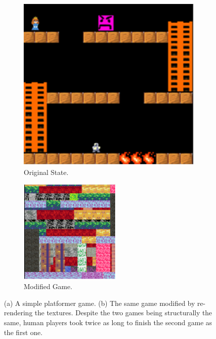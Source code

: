 \begin{figure}[ht]
  \centering
  \begin{subfigure}[b]{0.45\linewidth}
    \includegraphics[width=\linewidth]{Figures/Example1a.png}
    \caption{Original State.}
  \end{subfigure}
  \begin{subfigure}[b]{0.45\linewidth}
    \includegraphics[width=\linewidth]{Figures/Example1b.png}
    \caption{Modified Game.}
  \end{subfigure}
  \caption{(a) A simple platformer game. (b) The same game modified by re-rendering the textures. Despite the two games being structurally the same, human players took twice as long to finish the second game as the first one. \cite{Dubey2018HumanPriors}}
  \label{fig:example}
\end{figure}

